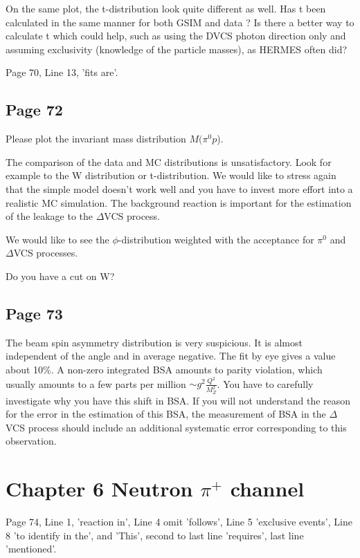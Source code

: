 \documentclass[11pt]{paper}
\begin{document}
On the same plot, the t-distribution look quite different as well.
Has t been calculated in the same manner for both GSIM and data ?
Is there a better way to calculate t which could help, such as using the DVCS photon direction only and assuming exclusivity (knowledge of the particle masses), as HERMES often did?

Page 70, Line 13, 'fits are'.

\subsection*{Page 72}

Please plot the invariant mass distribution $M(\pi^0p$).

The comparison of the data and MC distributions is unsatisfactory. Look for example to the W distribution
or t-distribution. We would like to stress again that the simple model doesn't work well and you have to invest more effort into a realistic MC simulation. 
The background reaction is important for the estimation of the leakage to the $\Delta$VCS process.

We would like to see the $\phi$-distribution weighted with the acceptance for
$\pi^0$ and $\Delta$VCS processes. 

Do you have a cut on W? 

\subsection*{Page 73}

The beam spin asymmetry distribution is very suspicious. It is almost independent of the angle
and in average negative. The fit by eye gives a value about 10\%. 
A non-zero integrated BSA amounts to parity violation, which usually amounts to a few parts per million $\sim g^2\frac{Q^2}{M_Z^2}$.
You have to carefully investigate why you have this shift in BSA. 
If you will not understand the reason for the error in the estimation of this BSA, 
the measurement of BSA in the $\Delta$VCS process should include an additional systematic error corresponding to this observation.

\section*{Chapter 6 Neutron $\pi^+$ channel}

Page 74, Line 1, 'reaction in', Line 4 omit 'follows', Line 5 'exclusive events', Line 8 'to identify in the', and 'This', second to last line 'requires', last line 'mentioned'.
\end{document}
